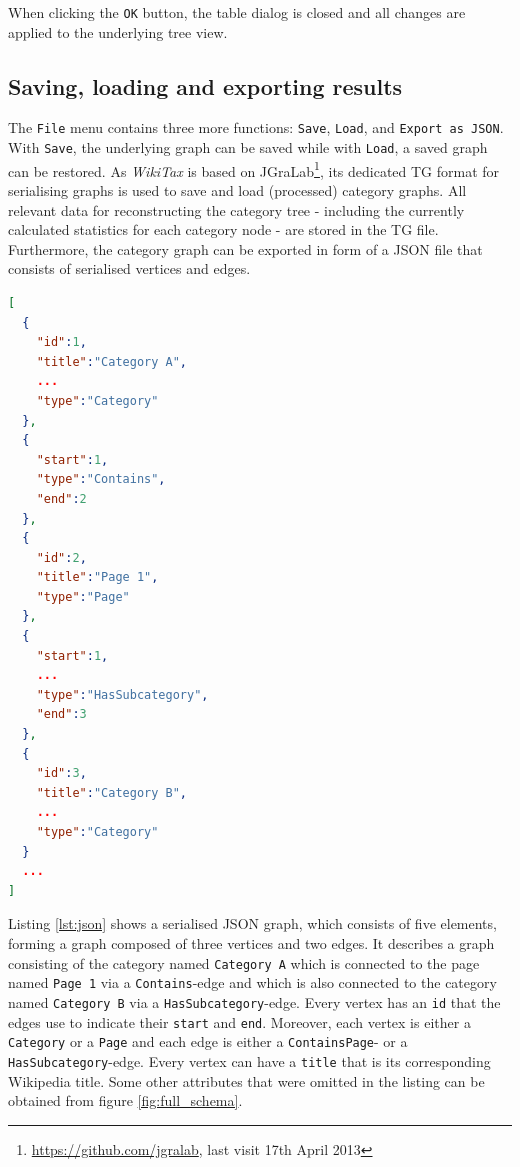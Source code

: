 \documentclass{scrartcl}
\begin{document}
When clicking the \texttt{OK} button, the table dialog is closed and all changes are applied to the underlying tree view.

\subsection{Saving, loading and exporting results}
\label{sec:save}
The \texttt{File} menu contains three more functions: \texttt{Save}, \texttt{Load},  and \texttt{Export as JSON}. With \texttt{Save}, the underlying graph can be saved while with \texttt{Load}, a saved graph can be restored. As \emph{WikiTax} is based on JGraLab\footnote{\url{https://github.com/jgralab}, last visit 17th April 2013}, its dedicated TG format for serialising graphs is used to save and load (processed) category graphs. All relevant data for reconstructing the category tree - including the currently calculated statistics for each category node - are stored in the TG file. Furthermore, the category graph can be exported in form of a JSON file \cite{RFC4627} that consists of serialised vertices and edges.

\begin{lstlisting}[frame=single,captionpos=b,caption={Serialised graph in JSON format (shortened)},label={lst:json},language=json]
[
  {
    "id":1,
    "title":"Category A",
    ...
    "type":"Category"
  },
  {
    "start":1,
    "type":"Contains",
    "end":2
  },
  {
    "id":2,
    "title":"Page 1",
    "type":"Page"
  },
  {
    "start":1,
    ...
    "type":"HasSubcategory",
    "end":3
  },
  {
    "id":3,
    "title":"Category B",
    ...
    "type":"Category"
  }
  ...
]
\end{lstlisting}

Listing \ref{lst:json} shows a serialised JSON graph, which consists of five elements, forming a graph composed of three vertices and two edges. It describes a graph consisting of the category named \texttt{Category A} which is connected to the page named \texttt{Page 1} via a \texttt{Contains}-edge and which is also connected to the category named \texttt{Category B} via a \texttt{HasSubcategory}-edge. Every vertex has an \texttt{id} that the edges use to indicate their \texttt{start} and \texttt{end}. Moreover, each vertex is either a \texttt{Category} or a \texttt{Page} and each edge is either a \texttt{ContainsPage}- or a \texttt{HasSubcategory}-edge. Every vertex can have a \texttt{title} that is its corresponding Wikipedia title. Some other attributes that were omitted in the listing can be obtained from figure \ref{fig:full_schema}.
\end{document}
